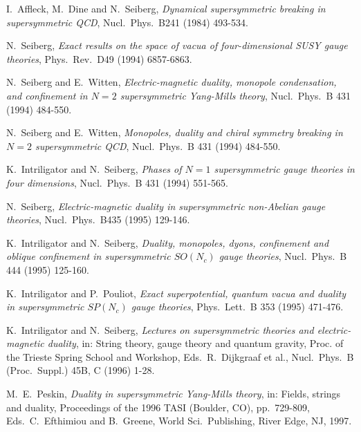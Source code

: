 \documentclass[lecture]{qft-l}
\begin{document}
\begin{thebibliography}{100}

	\item
I.\ Affleck, M.\ Dine and N.\ Seiberg, 
{\em Dynamical supersymmetric breaking in supersymmetric QCD},
Nucl.\ Phys.\ B241 (1984) 493-534.
	\item
N.\ Seiberg, {\em Exact results on the space of vacua of 
four-dimensional SUSY gauge theories},
Phys.\ Rev.\ D49 (1994) 6857-6863.
	\item
N.\ Seiberg and E.\ Witten, {\em Electric-magnetic duality, monopole
condensation, and confinement in $N=2$ supersymmetric Yang-Mills theory},
Nucl.\ Phys.\ B 431 (1994) 484-550.
	\item
N.\ Seiberg and E.\ Witten, {\em Monopoles, duality and chiral symmetry 
breaking in $N=2$ supersymmetric QCD}, Nucl.\ Phys.\ B 431 (1994) 484-550.
        \item
K.\ Intriligator and N.\ Seiberg,
{\em Phases of $N=1$ supersymmetric gauge theories in four dimensions},
Nucl.\ Phys.\ B 431 (1994) 551-565.
	\item
N.\ Seiberg,
{\em Electric-magnetic duality in supersymmetric non-Abelian gauge theories},
Nucl.\ Phys.\ B435 (1995) 129-146.
        \item
K.\ Intriligator and N.\ Seiberg,
{\em Duality, monopoles, dyons, confinement and oblique confinement in
supersymmetric $SO(N_c)$ gauge theories},
Nucl.\ Phys.\ B 444 (1995) 125-160.
	\item
K.\ Intriligator and P.\ Pouliot,
{\em Exact superpotential, quantum vacua and duality in supersymmetric 
$SP(N_c)$ gauge theories},
Phys.\ Lett.\ B 353 (1995) 471-476.
	\item
K.\ Intriligator and N.\ Seiberg, 
{\em Lectures on supersymmetric theories and electric-magnetic duality},
in: String theory, gauge theory and quantum gravity, Proc. of the Trieste 
Spring School and Workshop, Eds.\ R.\ Dijkgraaf et al.,
Nucl.\ Phys.\ B (Proc.\ Suppl.) 45B, C (1996) 1-28.
	\item
M.\ E.\ Peskin,
{\em Duality in supersymmetric Yang-Mills theory}, in:
Fields, strings and duality, Proceedings of the 1996 TASI (Boulder, CO),
pp.\ 729-809, Eds.\ C.\ Efthimiou and B.\ Greene, World Sci.\ Publishing,
River Edge, NJ, 1997.
	\end{thebibliography}

	
\end{document}
